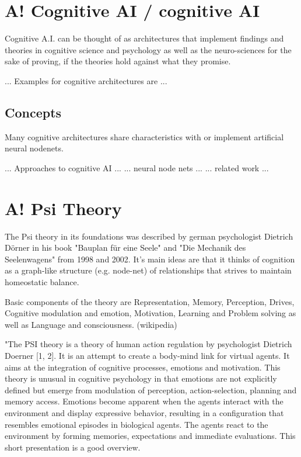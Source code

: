 \section{A! Cognitive AI / cognitive AI}
Cognitive A.I. can be thought of as architectures that implement findings and theories in cognitive science and psychology as well as the neuro-sciences for the sake of proving, if the theories hold against what they promise. 

... Examples for cognitive architectures are ...
\subsection{Concepts}
Many cognitive architectures share characteristics with or implement artificial neural nodenets.

... Approaches to cognitive AI ...
... neural node nets ...
... related work ...

\section{A! Psi Theory}
The Psi theory in its foundations was described by german psychologist Dietrich Dörner in his book "Bauplan für eine Seele" and "Die Mechanik des Seelenwagens" from 1998 and 2002. It's main ideas are that it thinks of cognition as a graph-like structure (e.g. node-net) of relationships that strives to maintain homeostatic balance.\cite{Bach:2009:PSI:1611304}

Basic components of the theory are Representation, Memory, Perception, Drives, Cognitive modulation and emotion, Motivation, Learning and Problem solving as well as Language and consciousness. (wikipedia)

"The PSI theory is a theory of human action regulation by psychologist Dietrich Doerner [1, 2]. It is an attempt to create a body-mind link for virtual agents. It aims at the integration of cognitive processes, emotions and motivation. This theory is unusual in cognitive psychology in that emotions are not explicitly defined but emerge from modulation of perception, action-selection, planning and memory access. Emotions become apparent when the agents interact with the environment and display expressive behavior, resulting in a configuration that resembles emotional episodes in biological agents. The agents react to the environment by forming memories, expectations and immediate evaluations. This short presentation is a good overview.

